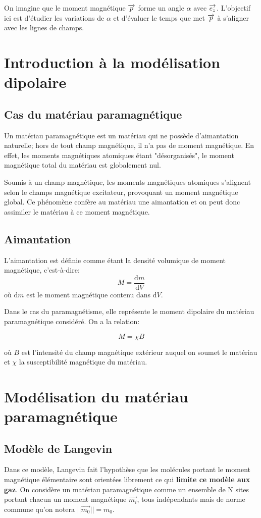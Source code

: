 \documentclass{report}
\begin{document}
On imagine que le moment magnétique $\overrightarrow{p}$ forme un angle $\alpha$ avec $\overrightarrow{e_z}$. L'objectif ici est d'étudier les variations de $\alpha$ et d'évaluer le temps que met $\overrightarrow{p}$ à s'aligner avec les lignes de champs.
\newpage

\section{Introduction à la modélisation dipolaire}
\subsection{Cas du matériau paramagnétique}
Un matériau paramagnétique est un matériau qui ne possède d'aimantation naturelle; hors de tout champ magnétique, il n'a pas de moment magnétique. En effet, les moments magnétiques atomiques étant "désorganisés", le moment magnétique total du matériau est globalement nul.

Soumis à un champ magnétique, les moments magnétiques atomiques s'alignent selon le champs magnétique excitateur, provoquant un moment magnétique global. Ce phénomène confère au matériau une aimantation et on peut donc assimiler le matériau à ce moment magnétique.

\subsection{Aimantation}
L'aimantation est définie comme étant la densité volumique de moment magnétique, c'est-à-dire: $$M = \frac{\mathrm{d}m}{\mathrm{d}V}$$
où $\mathrm{d}m$ est le moment magnétique contenu dans $\mathrm{d}V$.

Dans le cas du paramagnétisme, elle représente le moment dipolaire du matériau paramagnétique considéré. On a la relation:

$$M = \chi B$$

où $B$ est l'intensité du champ magnétique extérieur auquel on soumet le matériau et $\chi$ la susceptibilité magnétique du matériau.

\section{Modélisation du matériau paramagnétique}
\subsection{Modèle de Langevin}

Dans ce modèle, Langevin fait l'hypothèse que les molécules portant le moment magnétique élémentaire sont orientées librement ce qui \textbf{limite ce modèle aux gaz}.
On considère un matériau paramagnétique comme un ensemble de N sites portant chacun un moment magnétique $\vec{m_i}$, tous indépendants mais de norme commune qu'on notera $||\vec{m_0} || = m_0$.
\end{document}
